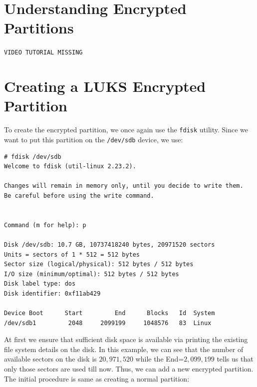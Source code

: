 	\section{Understanding Encrypted Partitions}
\begin{center}
	\verb|VIDEO TUTORIAL MISSING|
\end{center}

\section{Creating a LUKS Encrypted Partition}
To create the encrypted partition, we once again use the \verb|fdisk| utility. Since we want to put this partition on the \verb|/dev/sdb| device, we use:

\vspace{-15pt}
\begin{verbatim}
# fdisk /dev/sdb
Welcome to fdisk (util-linux 2.23.2).

Changes will remain in memory only, until you decide to write them.
Be careful before using the write command.


Command (m for help): p

Disk /dev/sdb: 10.7 GB, 10737418240 bytes, 20971520 sectors
Units = sectors of 1 * 512 = 512 bytes
Sector size (logical/physical): 512 bytes / 512 bytes
I/O size (minimum/optimal): 512 bytes / 512 bytes
Disk label type: dos
Disk identifier: 0xf11ab429

Device Boot      Start         End      Blocks   Id  System
/dev/sdb1         2048     2099199     1048576   83  Linux
\end{verbatim}
\vspace{-10pt}

\noindent
At first we ensure that sufficient disk space is available via printing the existing file system details on the disk. In this example, we can see that the number of available sectors on the disk is $20,971,520$ while the End=$2,099,199$ tells us that only those sectors are used till now. Thus, we can add a new encrypted partition. The initial procedure is same as creating a normal partition:


